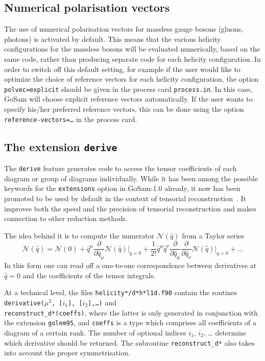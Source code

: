 \documentclass[11pt,a4paper]{refrep}
\newcommand{\gosam}{{\sc GoSam}\xspace}
\begin{document}
\subsection{Numerical polarisation vectors}
\label{sec:numpolvec}
The use of numerical polarisation vectors for massless gauge bosons
(gluons, photons) is activated by default.  This means that the
various helicity configurations for the massless bosons will be
evaluated numerically, based on the same code, rather than producing
separate code for each helicity configuration.  In order to switch off
this default setting,
for example if the user would like to 
optimize the choice of reference vectors for each helicity configuration,
the option {\tt polvec=explicit} should be given in the process card 
{\tt process.in}.
In this case, \gosam{} will choose explicit reference vectors automatically.
If the user wants to specify his/her preferred reference vectors, 
this can be done using the option {\tt reference-vectors=\ldots}
in the process card.

\subsection{The extension {\tt derive}}

The {\tt derive} feature generates code to access the tensor coefficients
of each diagram or group of diagrams individually.
While it has been among the possible keywords for the 
{\tt extensions} option in \gosam-1.0 already, it now has been promoted to 
be used by default in the context of  tensorial reconstruction~\cite{Heinrich:2010ax}.
It improves both the speed and the
precision of tensorial reconstruction and makes connection to other reduction methods.

The idea behind it is to compute the numerator $\mathcal{N}(\hat{q})$ 
from a Taylor series
\begin{equation}
\mathcal{N}(\hat{q})=\mathcal{N}(0)
+ \hat{q}^\mu
  \frac{\partial}{\partial\hat{q}_\mu}\mathcal{N}(\hat{q})\vert_{q=0}
+ \frac1{2!}\hat{q}^\mu\hat{q}^\nu
  \frac{\partial}{\partial\hat{q}_\mu}
  \frac{\partial}{\partial\hat{q}_\nu}
  \mathcal{N}(\hat{q})\vert_{q=0} + \ldots
\end{equation}
In this form one can read off a one-to-one correspondence between derivatives at
$\hat{q}=0$ and the coefficients of the tensor integrals.

At a technical level, 
the files \texttt{helicity*/d*h*l1d.f90} contain the routines
\texttt{derivative($\mu^2$, [$i_1$], [$i_2$],\dots)} and\\
\texttt{reconstruct\_d*(coeffs)}, where the latter is only generated in
conjunction with the extension \texttt{golem95}, and \texttt{coeffs} is
a type which comprises all coefficients of a diagram of a certain rank.
The number of optional indices $i_1$, $i_2$, \dots 
determine which derivative should be returned. The subroutine
\texttt{reconstruct\_d*} also takes into account the proper symmetrisation.
\end{document}
